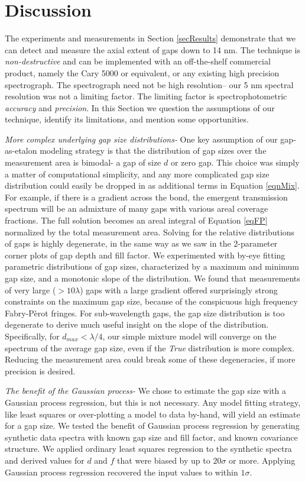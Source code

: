 \section{Discussion}

The experiments and measurements in Section \ref{secResults} demonstrate that we can detect and measure the axial extent of gaps down to 14 nm.  The technique is \emph{non-destructive} and can be implemented with an off-the-shelf commercial product, namely the Cary 5000 or equivalent, or any existing high precision spectrograph.  The spectrograph need not be high resolution-- our 5 nm spectral resolution was not a limiting factor.  The limiting factor is spectrophotometric \emph{accuracy} and \emph{precision}.  In this Section we question the assumptions of our technique, identify its limitations, and mention some opportunities.

\emph{More complex underlying gap size distributions-} One key assumption of our gap-as-etalon modeling strategy is that the distribution of gap sizes over the measurement area is bimodal- a gap of size $d$ or zero gap.  This choice was simply a matter of computational simplicity, and any more complicated gap size distribution could easily be dropped in as additional terms in Equation \ref{eqnMix}.  For example, if there is a gradient across the bond, the emergent transmission spectrum will be an admixture of many gaps with various areal coverage fractions.  The full solution becomes an areal integral of Equation \ref{eqFP} normalized by the total measurement area.  Solving for the relative distributions of gaps is highly degenerate, in the same way as we saw in the 2-parameter corner plots of gap depth and fill factor.  We experimented with by-eye fitting parametric distributions of gap sizes, characterized by a maximum and minimum gap size, and a monotonic slope of the distribution.  We found that measurements of very large ($>10\lambda$) gaps with a large gradient offered surprisingly strong constraints on the maximum gap size, because of the conspicuous high frequency Fabry-P\`erot fringes.  For sub-wavelength gaps, the gap size distribution is too degenerate to derive much useful insight on the slope of the distribution.  Specifically, for $d_{max}<\lambda/4$, our simple mixture model will converge on the spectrum of the average gap size, even if the \emph{True} distribution is more complex.  Reducing the measurement area could break some of these degeneracies, if more precision is desired.


\emph{The benefit of the Gaussian process-} We chose to estimate the gap size with a Gaussian process regression, but this is not necessary.  Any model fitting strategy, like least squares or over-plotting a model to data by-hand, will yield an estimate for a gap size.  We tested the benefit of Gaussian process regression by generating synthetic data spectra with known gap size and fill factor, and known covariance structure.  We applied ordinary least squares regression to the synthetic spectra and derived values for $d$ and $f$ that were biased by up to $20\sigma$ or more.  Applying Gaussian process regression recovered the input values to within $1\sigma$.


